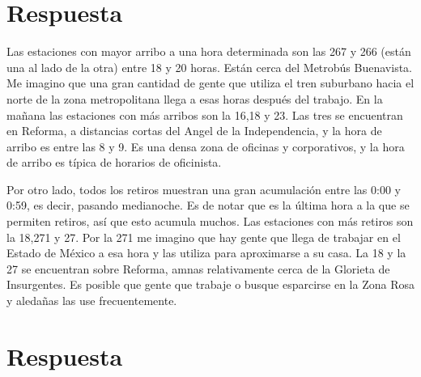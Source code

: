 \section{Respuesta}

Las estaciones con mayor arribo a una hora determinada son las 267 y 266 (están una al lado de la otra) entre 18 y 20 horas. Están cerca del Metrobús Buenavista. Me imagino que una gran cantidad de gente que utiliza el tren suburbano hacia el norte de la zona metropolitana llega a esas horas después del trabajo. En la mañana las estaciones con más arribos son la 16,18 y 23. Las tres se encuentran en Reforma, a distancias cortas del Angel de la Independencia, y la hora de arribo es entre las 8 y 9. Es una densa zona de oficinas y corporativos, y la hora de arribo es típica de horarios de oficinista.

Por otro lado, todos los retiros muestran una gran acumulación entre las 0:00 y 0:59, es decir, pasando medianoche. Es de notar que es la última hora a la que se permiten retiros, así que esto acumula muchos. Las estaciones con más retiros son la 18,271 y 27. Por la 271 me imagino que hay gente que llega de trabajar en el Estado de México a esa hora y las utiliza para aproximarse a su casa. La 18 y la 27 se encuentran sobre Reforma, amnas relativamente cerca de la Glorieta de Insurgentes. Es posible que gente que trabaje o busque esparcirse en la Zona Rosa y aledañas las use frecuentemente.

\section{Respuesta}



